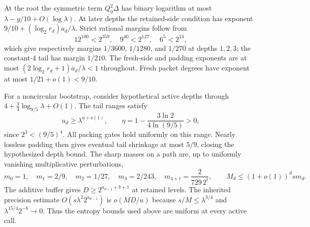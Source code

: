 At the root the symmetric term $Q_0^2\Delta$ has binary logarithm at
most $\lambda-g/10+O(\log\lambda)$.  At later depths the retained-side
condition has exponent $9/10+(\log_2r_d)a_d/\lambda$.
Strict rational margins follow from
\[
 12^{100}<2^{359},\quad9^{40}<2^{127},\quad6^5<2^{13},
\]
which give respectively margins $1/3600$, $1/1280$, and $1/270$ at
depths $1,2,3$; the constant-$4$ tail has margin $1/210$.
The fresh-side and padding exponents are at most
$(2\log_2r_d+1)a_d/\lambda<1$ throughout.  Fresh packet degrees have
exponent at most $1/21+o(1)<9/10$.

For a noncircular bootstrap, consider hypothetical active depths through
$4+\tfrac34\log_{9/5}\lambda+O(1)$.
The tail ranges satisfy
\[
 u_d\ge\lambda^{\eta+o(1)},\qquad
 \eta=1-\frac{3\ln2}{4\ln(9/5)}>0,
\]
since $2^3<(9/5)^4$.  All packing gates hold uniformly on this range.
Nearly lossless padding then gives eventual tail shrinkage at most
$5/9$, closing the hypothesized depth bound.  The sharp masses on a
path are, up to uniformly vanishing multiplicative perturbations,
\[
 m_0=1,\quad m_1=2/9,\quad m_2=1/27,\quad
 m_3=2/243,\quad m_{4+t}=\frac{2}{729\,2^t},
 \qquad M_d\le(1+o(1))^d s m_d.
\]
The additive buffer gives $D\ge2^{a_{d-1}+b+1}$ at retained levels.
The inherited precision estimate $O(s\lambda^2 2^{a_{d-1}})$ is
$o(MD/u)$ because $s/M\le\lambda^{3/4}$ and
$\lambda^{15/4}2^{-b}\to0$.  Thus the entropy bounds used above are
uniform at every active call.

